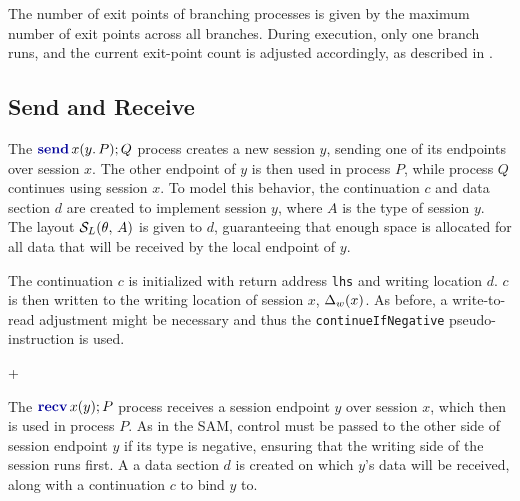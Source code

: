 The number of exit points of branching processes is given by the maximum number of exit points across all branches. During execution, only one branch runs, and the current exit-point count is adjusted accordingly, as described in .

\subsection{Send and Receive}

The $\sendc{x}{y}{P}Q$ process creates a new session $y$, sending one of its endpoints over session $x$. The other endpoint of $y$ is then used in process $P$, while process $Q$ continues using session $x$. To model this behavior, the continuation $c$ and data section $d$ are created to implement session $y$, where $A$ is the type of session $y$. The layout $\mathcal{S}_L(\theta,\,A)$ is given to $d$, guaranteeing that enough space is allocated for all data that will be received by the local endpoint of $y$.

The continuation $c$ is initialized with return address \texttt{lhs} and writing location $d$. $c$ is then written to the writing location of session $x$, $\Delta_w(x)$. As before, a write-to-read adjustment might be necessary and thus the \texttt{continueIfNegative} pseudo-instruction is used.

\begin{compilation}{\theta}{\Delta}{}
{ + }
     
\end{compilation}

The $\recvc{x}{y}P$ process receives a session endpoint $y$ over session $x$, which then is used in process $P$. As in the \ac{SAM}, control must be passed to the other side of session endpoint $y$ if its type is negative, ensuring that the writing side of the session runs first. A a data section $d$ is created on which $y$'s data will be received, along with a continuation $c$ to bind $y$ to.
\begin{compilation}{\theta}{\Delta}{}
{}
     
     
\end{compilation}

